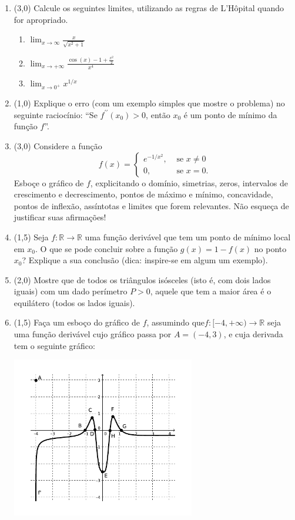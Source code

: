 \documentclass[12pt,a4paper]{article}
\newcommand*\R{\mathbb{R}}
\begin{document}
\begin{enumerate}

\item (3,0) Calcule os seguintes limites, utilizando as regras de L'Hôpital quando for apropriado.
\begin{multicols}{3}
\begin{enumerate}
\item $\displaystyle\lim_{x\to\infty} \frac{x}{\sqrt{x^2+1}}$
\item $\displaystyle\lim_{x\to +\infty} \frac{\cos(x)-1+\frac{x^2}{2}}{x^4}$
\item $\displaystyle\lim_{x\to 0^+} x^{1/x}$
\end{enumerate}
\end{multicols}

\item (1,0) Explique o erro (com um exemplo simples que mostre o problema) no seguinte raciocínio: ``Se $f^{\prime\prime}(x_0) > 0$, então $x_0$ é um ponto de mínimo da função $f$''.

\item (3,0) Considere a função \[f(x) = \begin{cases}
e^{-1 / x^2}, & \text{ se } x \neq 0 \\
0, & \text{ se } x=0.
\end{cases}\] Esboçe o gráfico de $f$, explicitando o domínio, simetrias, zeros, intervalos de crescimento e decrescimento, pontos de máximo e mínimo, concavidade, pontos de inflexão, assíntotas e limites que forem relevantes. Não esqueça de justificar suas afirmações!

\item (1,5) Seja $f: \R \to \R$ uma função derivável que tem um ponto de mínimo local em $x_0$. O que se pode concluir sobre a função $g(x) = 1 - f(x)$ no ponto $x_0$? Explique a sua conclusão (dica: inspire-se em algum um exemplo).

\item (2,0) Mostre que de todos os triângulos isósceles (isto é, com dois lados iguais) com um dado perímetro $P > 0$, aquele que tem a maior área é o equilátero (todos os lados iguais).

\item (1,5) Faça um esboço do gráfico de $f$, assumindo que$f: [-4, +\infty) \to \R$ seja uma função derivável cujo gráfico passa por $A=(-4,3)$, e cuja derivada tem o seguinte gráfico:

\includegraphics[width=8.0cm]{img/prova-3-mat-grafico-f'}

\end{enumerate}
\end{document}
